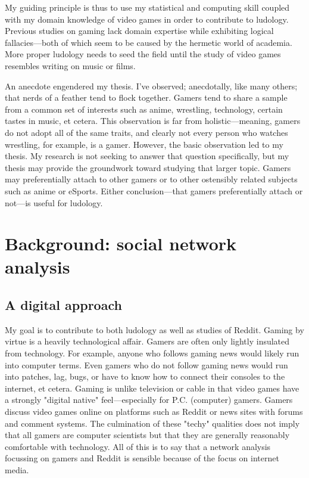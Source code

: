 \documentclass[12pt, a4paper]{article}
\begin{document}
My guiding principle is thus to use my statistical and computing skill coupled with my domain knowledge of video games in order to contribute to ludology. Previous studies on gaming lack domain expertise while exhibiting logical fallacies---both of which seem to be caused by the hermetic world of academia. More proper ludology needs to seed the field until the study of video games resembles writing on music or films.

An anecdote engendered my thesis. I've observed; anecdotally, like many others; that nerds of a feather tend to flock together. Gamers tend to share a sample from a common set of interests such as anime, wrestling, technology, certain tastes in music, et cetera. This observation is far from holistic---meaning, gamers do not adopt all of the same traits, and clearly not every person who watches wrestling, for example, is a gamer. However, the basic observation led to my thesis. My research is not seeking to answer that question specifically, but my thesis may provide the groundwork toward studying that larger topic. Gamers may preferentially attach to other gamers or to other ostensibly related subjects such as anime or eSports. Either conclusion---that gamers preferentially attach or not---is useful for ludology.

\section{Background: social network analysis}

\subsection{A digital approach}
My goal is to contribute to both ludology as well as studies of Reddit. Gaming by virtue is a heavily technological affair. Gamers are often only lightly insulated from technology. For example, anyone who follows gaming news would likely run into computer terms. Even gamers who do not follow gaming news would run into patches, lag, bugs, or have to know how to connect their consoles to the internet, et cetera. Gaming is unlike television or cable in that video games have a strongly "digital native" feel---especially for P.C. (computer) gamers. Gamers discuss video games online on platforms such as Reddit or news sites with forums and comment systems. The culmination of these "techy" qualities does not imply that all gamers are computer scientists but that they are generally reasonably comfortable with technology. All of this is to say that a network analysis focussing on gamers and Reddit is sensible because of the focus on internet media.
\end{document}
